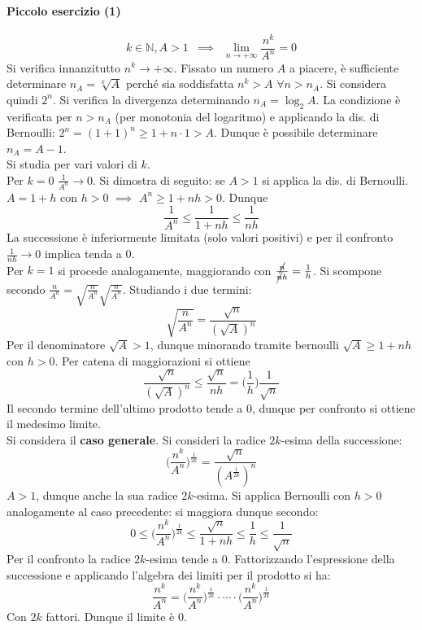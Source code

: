 \documentclass[10pt]{article}
\theoremstyle{plain}
\begin{document}
\paragraph*{Piccolo esercizio (1)}
\[k \in \mathbb{N}, A > 1 \enspace \implies \enspace \lim \limits_{n \rightarrow + \infty} \frac{n^k}{A^n} = 0\]
Si verifica innanzitutto $n^k \rightarrow +\infty$. Fissato un numero $A$ a piacere, è sufficiente determinare $n_A = \sqrt[k]{A}$ perché sia soddisfatta $n^k > A$ $\forall n > n_A$. Si considera quindi $2^n$. Si verifica la divergenza determinando $n_A = \log_2A$. La condizione è verificata per $n > n_A$ (per monotonia del logaritmo) e applicando la dis. di Bernoulli: $2^n = (1+1)^n \geq 1 + n\cdot 1 > A$. Dunque è possibile determinare $n_A = A -1$.
\\Si studia per vari valori di $k$.
\\Per $k=0$ $\frac{1}{A^n} \rightarrow 0$. Si dimostra di seguito: se $A>1$ si applica la dis. di Bernoulli. $A = 1+h$ con $h>0$ $\implies$ $A^n \geq 1 + nh > 0$. Dunque
\[\frac{1}{A^n} \leq \frac{1}{1+nh} \leq \frac{1}{nh}\]
La successione è inferiormente limitata (solo valori positivi) e per il confronto $\frac{1}{nh} \rightarrow 0$ implica tenda a 0.
\\Per $k=1$ si procede analogamente, maggiorando con $\frac{\cancel{n}}{\cancel{n}h} = \frac{1}{h}$. Si scompone secondo $\frac{n}{A^n} = \sqrt{\frac{n}{A^n}}\sqrt{\frac{n}{A^n}}$. Studiando i due termini:
\[\sqrt{\frac{n}{A^n}} = \frac{\sqrt{n}}{(\sqrt{A})^n}\]
Per il denominatore $\sqrt{A} > 1$, dunque minorando tramite bernoulli $\sqrt{A} \geq 1 + nh$ con $h>0$. Per catena di maggiorazioni si ottiene
\[\frac{\sqrt{n}}{(\sqrt{A})^n} \leq \frac{\sqrt{n}}{nh} = \bigg(\frac{1}{h}\bigg) \frac{1}{\sqrt{n}}\]
Il secondo termine dell'ultimo prodotto tende a 0, dunque per confronto si ottiene il medesimo limite.
\\Si considera il \textbf{caso generale}. Si consideri la radice $2k$-esima della successione: 
\[\bigg(\frac{n^k}{A^n}\bigg)^{\frac{1}{2k}} = \frac{\sqrt{n}}{(A^{\frac{1}{2k}})^n}\]
$A > 1$, dunque anche la sua radice $2k$-esima. Si applica Bernoulli con $h >0$ analogamente al caso precedente: si maggiora dunque secondo:
\[0 \leq \bigg(\frac{n^k}{A^n}\bigg)^{\frac{1}{2k}} \leq \frac{\sqrt{n}}{1 + nh} \leq \frac{1}{h} \leq \frac{1}{\sqrt{n}}\]
Per il confronto la radice $2k$-esima tende a 0. Fattorizzando l'espressione della successione e applicando l'algebra dei limiti per il prodotto si ha:
\[\frac{n^k}{A^n} = \bigg(\frac{n^k}{A^n}\bigg)^{\frac{1}{2k}} \cdot \cdots \cdot \bigg(\frac{n^k}{A^n}\bigg)^{\frac{1}{2k}}\]
Con $2k$ fattori. Dunque il limite è 0.
\end{document}
